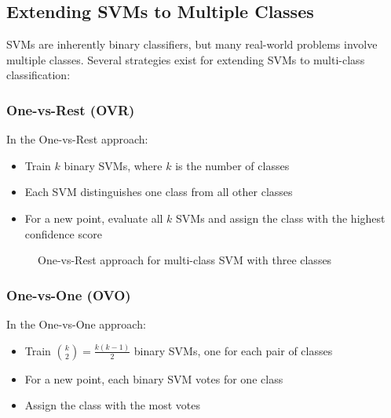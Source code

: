 \documentclass{article}
\begin{document}
\subsection{Extending SVMs to Multiple Classes}
SVMs are inherently binary classifiers, but many real-world problems involve multiple classes. Several strategies exist for extending SVMs to multi-class classification:

\subsubsection{One-vs-Rest (OVR)}
In the One-vs-Rest approach:
\begin{itemize}
    \item Train $k$ binary SVMs, where $k$ is the number of classes
    \item Each SVM distinguishes one class from all other classes
    \item For a new point, evaluate all $k$ SVMs and assign the class with the highest confidence score
\end{itemize}

\begin{figure}[h]
\centering
{}
\caption{One-vs-Rest approach for multi-class SVM with three classes}
\end{figure}

\subsubsection{One-vs-One (OVO)}
In the One-vs-One approach:
\begin{itemize}
    \item Train $\binom{k}{2} = \frac{k(k-1)}{2}$ binary SVMs, one for each pair of classes
    \item For a new point, each binary SVM votes for one class
    \item Assign the class with the most votes
\end{itemize}
\end{document}
